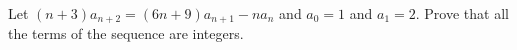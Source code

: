 Let $(n+3)a_{n+2}=(6n+9)a_{n+1}-na_n$ and $a_0=1$ and $a_1=2$. Prove that all the terms of the sequence are integers.
